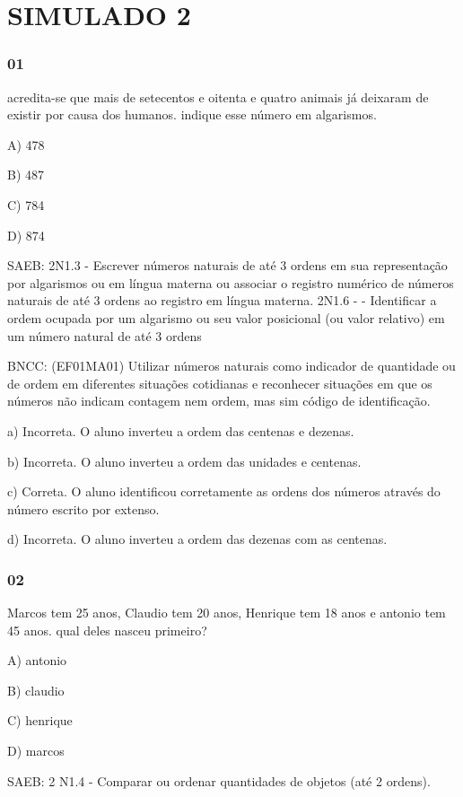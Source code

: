 \section{SIMULADO 2}\label{simulado-2}

\subsubsection{01}\label{section-102}

acredita-se que mais de setecentos e oitenta e quatro animais já
deixaram de existir por causa dos humanos. indique esse número em
algarismos.

A) 478

B) 487

C) 784

D) 874

SAEB: 2N1.3 - Escrever números naturais de até 3 ordens em sua
representação por algarismos ou em língua materna ou associar o registro
numérico de números naturais de até 3 ordens ao registro em língua
materna. 2N1.6 - - Identificar a ordem ocupada por um algarismo ou seu
valor posicional (ou valor relativo) em um número natural de até 3
ordens

BNCC: (EF01MA01) Utilizar números naturais como indicador de quantidade
ou de ordem em diferentes situações cotidianas e reconhecer situações em
que os números não indicam contagem nem ordem, mas sim código de
identificação.

a) Incorreta. O aluno inverteu a ordem das centenas e dezenas.

b) Incorreta. O aluno inverteu a ordem das unidades e centenas.

c) Correta. O aluno identificou corretamente as ordens dos números
através do número escrito por extenso.

d) Incorreta. O aluno inverteu a ordem das dezenas com as centenas.

\subsubsection{02}\label{section-103}

Marcos tem 25 anos, Claudio tem 20 anos, Henrique tem 18 anos e antonio
tem 45 anos. qual deles nasceu primeiro?

A) antonio

B) claudio

C) henrique

D) marcos

SAEB: 2 N1.4 - Comparar ou ordenar quantidades de objetos (até 2
ordens).

